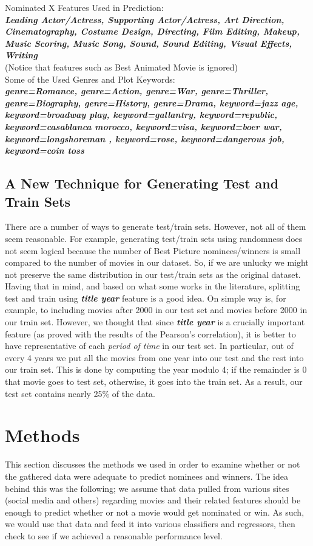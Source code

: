 \documentclass[journal,transmag]{IEEEtran}
\begin{document}
\noindent
Nominated X Features Used in Prediction:\\
\textit{\textbf{Leading Actor/Actress, Supporting	 Actor/Actress, Art Direction, Cinematography, Costume Design, Directing, Film Editing, Makeup,  Music Scoring, Music Song, Sound, Sound Editing, Visual Effects, Writing }}\\ 
(Notice that features such as Best Animated Movie is ignored)\\

\noindent
Some of the Used Genres and Plot Keywords:\\
\textit{\textbf{genre=Romance,	genre=Action,	genre=War,	genre=Thriller,	genre=Biography,	 genre=History,	genre=Drama, keyword=jazz age,	keyword=broadway play,	keyword=gallantry,	keyword=republic,	keyword=casablanca morocco,	keyword=visa,	keyword=boer war,	keyword=longshoreman	, keyword=rose, 	keyword=dangerous job,	keyword=coin toss}}

\subsection{A New Technique for Generating Test and Train Sets}
There are a number of ways to generate test/train sets. However, not all of them seem reasonable. For example, generating test/train sets using randomness does not seem logical because the number of Best Picture nominees/winners is small compared to the number of movies in our dataset. So, if we are unlucky we might not preserve the same distribution in our test/train sets as the original dataset. \\
Having that in mind, and based on what some works in the literature, splitting test and train using \textbf{\textit{title year}} feature is a good idea. On simple way is, for example, to including movies after 2000 in our test set and movies before 2000 in our train set. However, we thought that since \textbf{\textit{title year}} is a crucially important feature (as proved with the results of the Pearson's correlation), it is better to have representative of each \textit{period of time} in our test set. In particular, out of every 4 years we put all the movies from one year into our test and the rest into our train set. This is done by computing the year modulo 4; if the remainder is 0 that movie goes to test set, otherwise, it goes into the train set. As a result, our test set contains nearly 25$\%$ of the data.


	
	
	\section{Methods}
	This section discusses the methods we used in order to examine whether or not the gathered data were adequate to predict nominees and winners. The idea behind this was the following; we assume that data pulled from various sites (social media and others) regarding movies and their related features should be enough to predict whether or not a movie would get nominated or win. As such, we would use that data and feed it into various classifiers and regressors, then check to see if we achieved a reasonable performance level.
	
\end{document}
